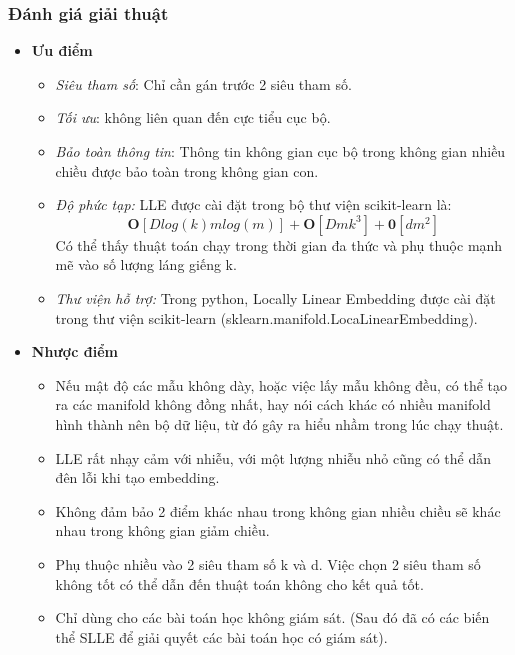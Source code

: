 \subsubsection{Đánh giá giải thuật}
\begin{itemize}
	\item \textbf{Ưu điểm}
	\begin{itemize}
		\item \textit{Siêu tham số}: Chỉ cần gán trước 2 siêu tham số.
		\item \textit{Tối ưu}: không liên quan đến cực tiểu cục bộ.
		\item \textit{Bảo toàn thông tin}: Thông tin không gian cục bộ trong không gian nhiều chiều được bảo toàn trong không gian con.
		\item \textit{Độ phức tạp:} LLE được cài đặt trong bộ thư viện scikit-learn là: $$\mathbf{O}[D log(k) m log(m)] + \mathbf{O}[Dmk^3] + \mathbf{0}[dm^2]$$
		Có thể thấy thuật toán chạy trong thời gian đa thức và phụ thuộc mạnh mẽ vào số lượng láng giếng k.
		\item \textit{Thư viện hỗ trợ:} Trong python, Locally Linear Embedding được cài đặt trong thư viện scikit-learn (sklearn.manifold.LocaLinearEmbedding).
	\end{itemize}
	\item \textbf{Nhược điểm}
	\begin{itemize}
		\item Nếu mật độ các mẫu không dày, hoặc việc lấy mẫu không đều, có thể tạo ra các manifold không đồng nhất, hay nói cách khác có nhiều manifold hình thành nên bộ dữ liệu, từ đó gây ra hiểu nhầm trong lúc chạy thuật.
		\item LLE rất nhạy cảm với nhiễu, với một lượng nhiễu nhỏ cũng có thể dẫn đên lỗi khi tạo embedding. 
		\item Không đảm bảo 2 điểm khác nhau trong không gian nhiều chiều sẽ khác nhau trong không gian giảm chiều. 
		\item Phụ thuộc nhiều vào 2 siêu tham số k và d. Việc chọn 2 siêu tham số không tốt có thể dẫn đến thuật toán không cho kết quả tốt.
		\item Chỉ dùng cho các bài toán học không giám sát. (Sau đó đã có các biến thể SLLE để giải quyết các bài toán học có giám sát).
	\end{itemize}
\end{itemize}